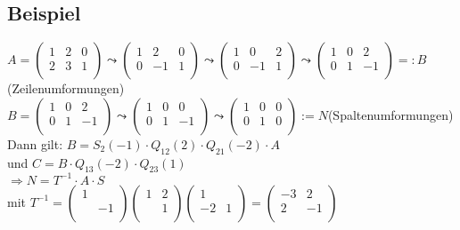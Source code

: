 \documentclass[a4paper, 12pt]{extarticle}
\begin{document}
\subsection*{Beispiel}
$
A = 
\left(\begin{matrix} 
1 & 2 & 0 \\
2 & 3 & 1 \\
\end{matrix} \right) \leadsto
\left(\begin{matrix} 
1 & 2 & 0 \\
0 & -1 & 1 \\
\end{matrix} \right) \leadsto
\left(\begin{matrix} 
1 & 0 & 2 \\
0 & -1 & 1 \\
\end{matrix} \right) \leadsto
\left(\begin{matrix} 
1 & 0 & 2 \\
0 & 1 & -1 \\
\end{matrix} \right) =: B
$ (Zeilenumformungen)\\
$
B = \left(\begin{matrix} 
1 & 0 & 2 \\
0 & 1 & -1 \\
\end{matrix} \right) \leadsto
\left(\begin{matrix} 
1 & 0 & 0 \\
0 & 1 & -1 \\
\end{matrix} \right) \leadsto
\left(\begin{matrix} 
1 & 0 & 0 \\
0 & 1 & 0 \\
\end{matrix} \right) := N
$(Spaltenumformungen)\\
Dann gilt: $B = S_2(-1)\cdot Q_{12}(2)\cdot Q_{21}(-2)\cdot A$\\
und $C = B \cdot Q_{13}(-2) \cdot Q_{23}(1)$\\
$\Rightarrow N = T^{-1}\cdot A \cdot S$\\
mit $T^{-1} =\left(\begin{matrix} 
1 \\
& -1 \\
\end{matrix} \right)\left(\begin{matrix} 
1 & 2 \\
& 1 \\
\end{matrix} \right)\left(\begin{matrix} 
1 \\
-2 & 1\\
\end{matrix} \right) = \left(\begin{matrix} 
-3 & 2\\
2 & -1\\
\end{matrix} \right)$ \\
\end{document}
